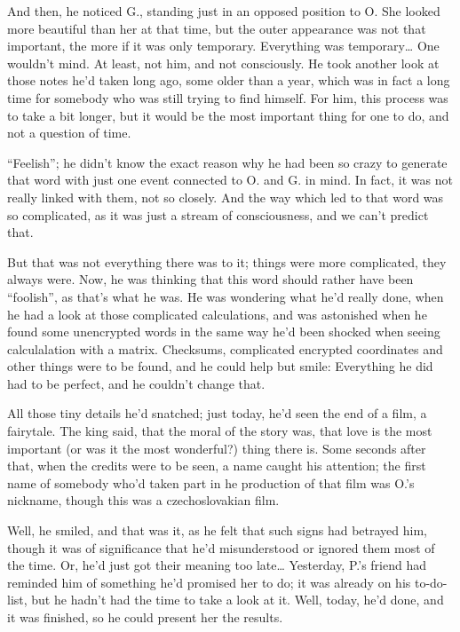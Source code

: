 And then, he noticed G., standing just in an opposed position to O. She looked more beautiful than her at that time, but the outer appearance was not that important, the more if it was only temporary. 
Everything was temporary\ldots
One wouldn't mind. At least, not him, and not consciously. 
He took another look at those notes he'd taken long ago, some older than a year, which was in fact a long time for somebody who was still trying to find himself. For him, this process was to take a bit longer, but it would be the most important thing for one to do, and not a question of time.

\enquote{Feelish}; he didn't know the exact reason why he had been so crazy to generate that word with just one event connected to O. and G. in mind. In fact, it was not really linked with them, not so closely. And the way which led to that word was so complicated, as it was just a stream of consciousness, and we can't predict that.

But that was not everything there was to it; things were more complicated, they always were. Now, he was thinking that this word should rather have been \enquote{foolish}, as that's what he was. He was wondering what he'd really done, when he had a look at those complicated calculations, and was astonished when he found some unencrypted words in the same way he'd been shocked when seeing calculalation with a matrix. Checksums, complicated encrypted coordinates and other things were to be found, and he could help but smile: Everything he did had to be perfect, and he couldn't change that.

All those tiny details he'd snatched; just today, he'd seen the end of a film, a fairytale. The king said, that the moral of the story was, that love is the most important (or was it the most wonderful?) thing there is. Some seconds after that, when the credits were to be seen, a name caught his attention; the first name of somebody who'd taken part in he production of that film was O.'s nickname, though this was a czechoslovakian film.

Well, he smiled, and that was it, as he felt that such signs had betrayed him, though it was of significance that he'd misunderstood or ignored them most of the time. 
Or, he'd just got their meaning too late\ldots
Yesterday, P.'s friend had reminded him of something he'd promised her to do; it was already on his to-do-list, but he hadn't had the time to take a look at it. Well, today, he'd done, and it was finished, so he could present her the results.

